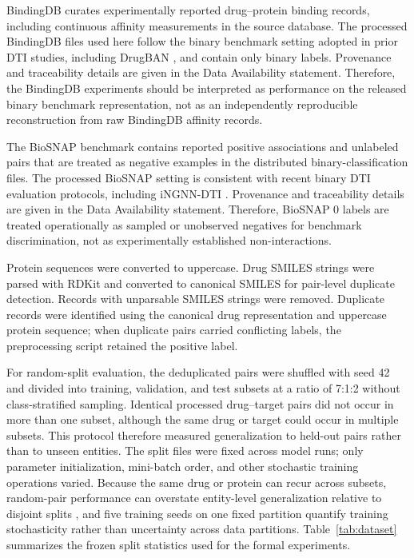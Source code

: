 \documentclass[computers,article,submit,moreauthors]{Definitions/mdpi}
\begin{document}
BindingDB curates experimentally reported drug--protein binding records, including continuous affinity measurements in the source database. The processed BindingDB files used here follow the binary benchmark setting adopted in prior DTI studies, including DrugBAN \citep{bai2023drugban}, and contain only binary labels. Provenance and traceability details are given in the Data Availability statement. Therefore, the BindingDB experiments should be interpreted as performance on the released binary benchmark representation, not as an independently reproducible reconstruction from raw BindingDB affinity records.

The BioSNAP benchmark contains reported positive associations and unlabeled pairs that are treated as negative examples in the distributed binary-classification files. The processed BioSNAP setting is consistent with recent binary DTI evaluation protocols, including iNGNN-DTI \citep{sun2024ingnndti}. Provenance and traceability details are given in the Data Availability statement. Therefore, BioSNAP 0 labels are treated operationally as sampled or unobserved negatives for benchmark discrimination, not as experimentally established non-interactions.

Protein sequences were converted to uppercase. Drug SMILES strings were parsed with RDKit and converted to canonical SMILES for pair-level duplicate detection. Records with unparsable SMILES strings were removed. Duplicate records were identified using the canonical drug representation and uppercase protein sequence; when duplicate pairs carried conflicting labels, the preprocessing script retained the positive label.

For random-split evaluation, the deduplicated pairs were shuffled with seed 42 and divided into training, validation, and test subsets at a ratio of 7:1:2 without class-stratified sampling. Identical processed drug--target pairs did not occur in more than one subset, although the same drug or target could occur in multiple subsets. This protocol therefore measured generalization to held-out pairs rather than to unseen entities. The split files were fixed across model runs; only parameter initialization, mini-batch order, and other stochastic training operations varied. Because the same drug or protein can recur across subsets, random-pair performance can overstate entity-level generalization relative to disjoint splits \citep{torrisi2022}, and five training seeds on one fixed partition quantify training stochasticity rather than uncertainty across data partitions. Table~\ref{tab:dataset} summarizes the frozen split statistics used for the formal experiments.
\end{document}

